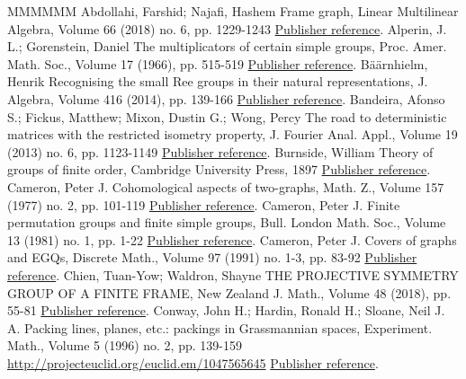 \documentclass[11pt]{article}
\theoremstyle{definition}
\numberwithin{equation}{section}
\begin{document}
\begin{thebibliography}{MMMMMM}
 Abdollahi, Farshid; Najafi, Hashem Frame graph, Linear Multilinear Algebra, Volume 66 (2018) no. 6, pp. 1229-1243 \href{https://alco.centre-mersenne.org/articles/10.5802/alco.324/#AN:18}{Publisher reference}.
 Alperin, J. L.; Gorenstein, Daniel The multiplicators of certain simple groups, Proc. Amer. Math. Soc., Volume 17 (1966), pp. 515-519 \href{https://alco.centre-mersenne.org/articles/10.5802/alco.324/#AlperinGorenstein:66}{Publisher reference}.
 Bäärnhielm, Henrik Recognising the small Ree groups in their natural representations, J. Algebra, Volume 416 (2014), pp. 139-166 \href{https://alco.centre-mersenne.org/articles/10.5802/alco.324/#Baarnhielm:14}{Publisher reference}.
 Bandeira, Afonso S.; Fickus, Matthew; Mixon, Dustin G.; Wong, Percy The road to deterministic matrices with the restricted isometry property, J. Fourier Anal. Appl., Volume 19 (2013) no. 6, pp. 1123-1149 \href{https://alco.centre-mersenne.org/articles/10.5802/alco.324/#BandeiraFickusMixonWong:13}{Publisher reference}.
 Burnside, William Theory of groups of finite order, Cambridge University Press, 1897 \href{https://alco.centre-mersenne.org/articles/10.5802/alco.324/#Burnside:97}{Publisher reference}.
 Cameron, Peter J. Cohomological aspects of two-graphs, Math. Z., Volume 157 (1977) no. 2, pp. 101-119 \href{https://alco.centre-mersenne.org/articles/10.5802/alco.324/#Cameron:77}{Publisher reference}.
 Cameron, Peter J. Finite permutation groups and finite simple groups, Bull. London Math. Soc., Volume 13 (1981) no. 1, pp. 1-22 \href{https://alco.centre-mersenne.org/articles/10.5802/alco.324/#Cameron:81}{Publisher reference}.
 Cameron, Peter J. Covers of graphs and EGQs, Discrete Math., Volume 97 (1991) no. 1-3, pp. 83-92 \href{https://alco.centre-mersenne.org/articles/10.5802/alco.324/#Cameron:91}{Publisher reference}.
 Chien, Tuan-Yow; Waldron, Shayne THE PROJECTIVE SYMMETRY GROUP OF A FINITE FRAME, New Zealand J. Math., Volume 48 (2018), pp. 55-81 \href{https://alco.centre-mersenne.org/articles/10.5802/alco.324/#ChienWaldron:18}{Publisher reference}.
 Conway, John H.; Hardin, Ronald H.; Sloane, Neil J. A. Packing lines, planes, etc.: packings in Grassmannian spaces, Experiment. Math., Volume 5 (1996) no. 2, pp. 139-159 \url{http://projecteuclid.org/euclid.em/1047565645} \href{https://alco.centre-mersenne.org/articles/10.5802/alco.324/#ConwayHardinSloane:96}{Publisher reference}.

\end{thebibliography}
\end{document}
